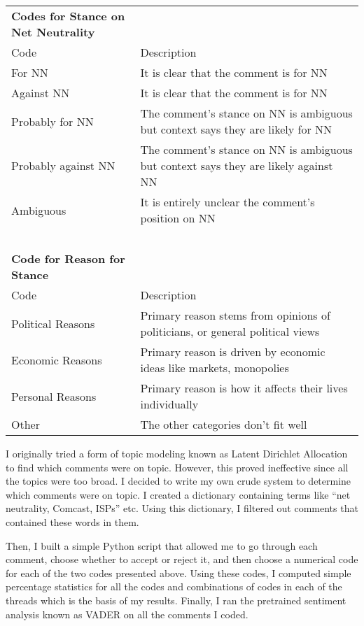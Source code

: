 \documentclass[11pt]{article}
\begin{document}
	\begin{small}
		\begin{tabular}{l|l}
			\multicolumn{1}{l}{\textbf{Codes for Stance on Net Neutrality}} & \\
			Code & Description \\\hline
			For NN & It is clear that the comment is for NN \\
			Against NN & It is clear that the comment is for NN \\
			Probably for NN & The comment's stance on NN is ambiguous but context says they are likely for NN \\
			Probably against NN & The comment's stance on NN is ambiguous but context says they are likely against NN \\
			Ambiguous & It is entirely unclear the comment's position on NN \\
			\multicolumn{1}{l}{} & \ \\
			\multicolumn{1}{l}{\textbf{Code for Reason for Stance}} & \\
			Code  & Description \\\hline
			Political Reasons & Primary reason stems from opinions of politicians, or general political views \\
			Economic Reasons & Primary reason is driven by economic ideas like markets, monopolies\\
			Personal Reasons & Primary reason is how it affects their lives individually  \\
			Other & The other categories don't fit well
		\end{tabular}
	\end{small}
	
	
	I originally tried a form of topic modeling known as Latent Dirichlet Allocation to find which comments were on topic. However, this proved ineffective since all the topics were too broad. I decided to write my own crude system to determine which comments were on topic. I created a dictionary containing terms like ``net neutrality, Comcast, ISPs'' etc. Using this dictionary, I filtered out comments that contained these words in them. 
	
	Then, I built a simple Python script that allowed me to go through each comment, choose whether to accept or reject it, and then choose a numerical code for each of the two codes presented above. Using these codes, I computed simple percentage statistics for all the codes and combinations of codes in each of the threads which is the basis of my results. Finally, I ran the pretrained sentiment analysis known as VADER \cite{hutto2014vader} on all the comments I coded.
\end{document}

